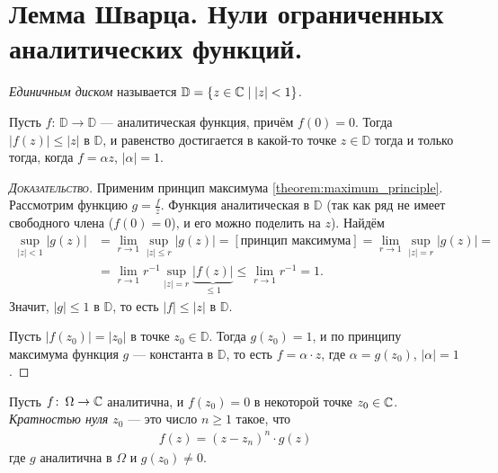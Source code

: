 \documentclass[../complex-analysis.tex]{subfiles}
\begin{document}
\newpage
\section{Лемма Шварца. Нули ограниченных аналитических функций.}

\begin{df*}
 \textit{Единичным диском} называется $ \mathbb D = \left\{ z \in \mathbb{C} \;\middle|\; \left| z \right| < 1 \right\} $.
\end{df*}

\begin{lm}[Шварца]
 Пусть $ f \colon\, \mathbb D \to \mathbb D $ --- аналитическая функция, причём $ f(0) = 0 $. Тогда $ \left| f(z) \right| \leqslant \left| z \right| $ в $ \mathbb D $, и равенство достигается в какой-то точке $ z \in \mathbb D $ тогда и только тогда, когда $f = \alpha z$, $ \left| \alpha  \right| = 1 $.
\end{lm}
\begin{proof}[\normalfont\textsc{Доказательство}]
Применим принцип максимума \eqref{theorem:maximum_principle}. Рассмотрим функцию $ g=\frac{f}{z} $. Функция аналитическая в $ \mathbb D $ (так как ряд не имеет свободного члена ($ f(0) = 0 $), и его можно поделить на $ z $). Найдём
 \begin{align*}
  \sup_{\left| z \right| < 1} \left| g(z) \right| &= \lim_{r \to 1} \sup_{\left| z \right| \leqslant r} \left| g(z) \right| = [\text{принцип максимума}] = \lim_{r\to 1} \sup_{\left| z \right| = r} \left| g(z) \right| = \\
  &= \lim_{r \to 1} r^{-1} \sup_{\left| z \right| = r} \underbrace{\left| f(z) \right|}_{\leq 1} \leqslant \lim_{r \to 1} r^{-1} = 1.
 \end{align*} Значит, $ \left| g \right| \leqslant 1 $ в $ \mathbb D $, то есть $ \left| f \right| \leqslant \left| z \right| $ в $ \mathbb D $.

 Пусть $ \left|f(z_0) \right| = \left| z_0 \right| $ в точке $ z_0 \in \mathbb D $. Тогда $ g(z_0) = 1 $, и по принципу максимума функция $ g $ --- константа в $ \mathbb D $, то есть $ f = \alpha \cdot z $, где $ \alpha = g(z_0) $, $ \left| \alpha \right|=1 $.
\end{proof}

\begin{df}
 Пусть $ f \colon\, \Omega \to \mathbb{C} $ аналитична, и $ f(z_0) = 0 $ в некоторой точке $ z_0 \in \mathbb{C} $. \textit{Кратностью нуля $ z_0 $} --- это число $ n \geqslant 1 $ такое, что
 \begin{align*}
  f(z) = (z-z_n)^{n} \cdot g(z)
 \end{align*} где $ g $ аналитична в $ \Omega $ и $ g(z_0) \neq 0 $.
\end{df}
\end{document}

